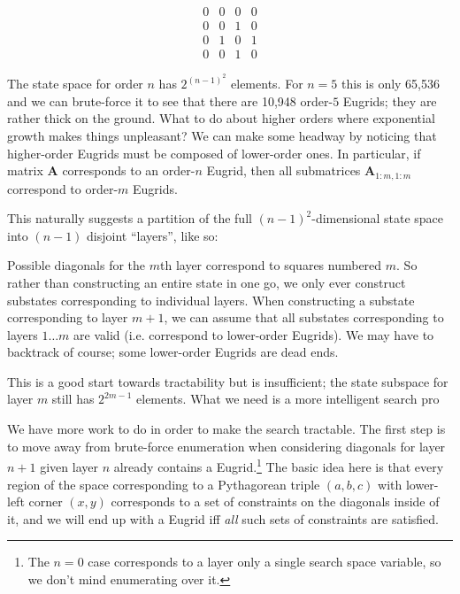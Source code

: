 \documentclass[letterpaper]{article}
\begin{document}
\begin{equation*}
\begin{matrix}
  0 & 0 & 0 & 0 \\
  0 & 0 & 1 & 0 \\
  0 & 1 & 0 & 1 \\
  0 & 0 & 1 & 0
\end{matrix}
\end{equation*}

The state space for order $n$ has $2^{(n-1)^2}$ elements. For $n=5$ this is only 65,536 and
we can brute-force it to see that there are 10,948 order-$5$ Eugrids; they are rather thick
on the ground. What to do about higher orders where exponential growth makes things
unpleasant? We can make some headway by noticing that higher-order Eugrids must be composed
of lower-order ones. In particular, if matrix $\mathbf{A}$ corresponds to an order-$n$
Eugrid, then all submatrices $\mathbf{A}_{1:m,1:m}$ correspond to order-$m$ Eugrids.

This naturally suggests a partition of the full $(n-1)^2$-dimensional state space into
$(n-1)$ disjoint ``layers'', like so:

\begin{center}
  
\end{center}

Possible diagonals for the $m$th layer correspond to squares numbered $m$. So rather than
constructing an entire state in one go, we only ever construct substates corresponding to
individual layers. When constructing a substate corresponding to layer $m+1$, we can assume
that all substates corresponding to layers $1 \ldots m$ are valid (i.e. correspond to
lower-order Eugrids). We may have to backtrack of course; some lower-order Eugrids are dead
ends.

This is a good start towards tractability but is insufficient; the state subspace for layer
$m$ still has $2^{2m-1}$ elements. What we need is a more intelligent search pro

We have more work to do in order to make the search tractable. The first step is to move away
from brute-force enumeration when considering diagonals for layer $n+1$ given layer $n$
already contains a Eugrid.\footnote{The $n=0$ case corresponds to a layer only a single
search space variable, so we don't mind enumerating over it.} The basic idea here is that
every region of the space corresponding to a Pythagorean triple $(a, b, c)$ with lower-left
corner $(x, y)$ corresponds to a set of constraints on the diagonals inside of it, and we
will end up with a Eugrid iff \emph{all} such sets of constraints are satisfied.
\end{document}
